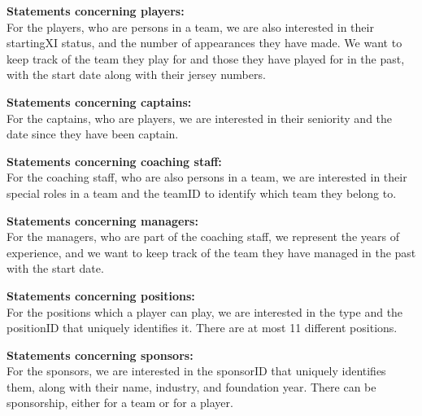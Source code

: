\documentclass{article}[h]
\begin{document}
\vspace{12px}
\textbf{Statements concerning players:\\}
For the players, who are persons in a team, we are also interested in their startingXI status, and the number of appearances they have made.
We want to keep track of the team they play for and those they have played for in the past, with the start date along with their jersey numbers.

\vspace{12px}
\textbf{Statements concerning captains:\\}
For the captains, who are players, we are interested in their seniority and the date since they have been captain.

\vspace{12px}
\textbf{Statements concerning coaching staff:\\}
For the coaching staff, who are also persons in a team, we are interested in their special roles in a team and the teamID to identify which team they belong to.

\vspace{12px}
\textbf{Statements concerning managers:\\}
For the managers, who are part of the coaching staff, we represent the years of experience, and we want to keep track of the team they have managed in the past with the start date.

\vspace{12px}
\textbf{Statements concerning positions:\\}
For the positions which a player can play, we are interested in the type and the positionID that uniquely identifies it.
There are at most 11 different positions.

\vspace{12px}
\textbf{Statements concerning sponsors:\\}
For the sponsors, we are interested in the sponsorID that uniquely identifies them, along with their name, industry, and foundation year.
There can be sponsorship, either for a team or for a player.

\pagebreak
\end{document}
